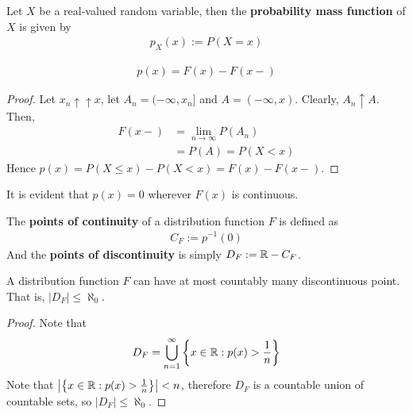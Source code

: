 \documentclass{article}
\begin{document}
   	\begin{definition}
   		Let $X$ be a real-valued random variable, then the \textbf{probability mass function} of $X$ is given by
   		\begin{align}
   			p_X(x) := P(X=x)
   		\end{align}
   	\end{definition}
   	
   	\begin{proposition}
   		\begin{align}
   			p(x) = F(x) - F(x-)
   		\end{align}
   	\end{proposition}
   	\begin{proof}
   		Let $x_n \uparrow\uparrow x$, let $A_n = (-\infty, x_n]$ and $A = (-\infty, x)$. Clearly, $A_n \uparrow A$. Then,
   		\begin{align}
   			F(x-) &= \lim_{n \to \infty} P(A_n) \\
   			&= P(A) = P(X < x)
   		\end{align}
   		Hence $p(x) = P(X \leq x) - P(X < x) = F(x) - F(x-)$.
   	\end{proof}
   	
   	\begin{proposition}
   		It is evident that $p(x) = 0$ wherever $F(x)$ is continuous.
   	\end{proposition}
   	
   	\begin{definition}
   		The \textbf{points of continuity} of a distribution function $F$ is defined as
   		\begin{align}
   			C_F := p^{-1}(0)
   		\end{align}
   		And the \textbf{points of discontinuity} is simply $D_F := \mathbb{R} - C_F$.
   	\end{definition}
   	
   	\begin{theorem}
   		A distribution function $F$ can have at most countably many discontinuous point. That is, $|D_F| \leq \aleph_0$.
   	\end{theorem}
   	
   	\begin{proof}
   		Note that
   		\begin{align}
   			D_F = \bigcup_{n=1}^\infty \left\{x\in \mathbb{R}: p(x) > \frac{1}{n}\right\}
   		\end{align}
   		Note that $\big \vert {\left\{x\in \mathbb{R}: p(x) > \frac{1}{n}\right\}} \big \vert < n$, therefore $D_F$ is a countable union of countable sets, so $|D_F| \leq \aleph_0$.
   	\end{proof}
\end{document}
